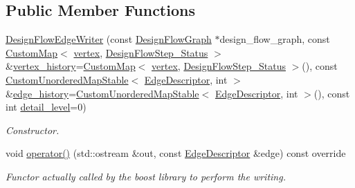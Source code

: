 \subsection*{Public Member Functions}
\begin{DoxyCompactItemize}
\item 
\hyperlink{classDesignFlowEdgeWriter_a3cdba4165ae8567ef5f98e632c9b03af}{Design\+Flow\+Edge\+Writer} (const \hyperlink{classDesignFlowGraph}{Design\+Flow\+Graph} $\ast$design\+\_\+flow\+\_\+graph, const \hyperlink{custom__map_8hpp_a18ca01763abbe3e5623223bfe5aaac6b}{Custom\+Map}$<$ \hyperlink{graph_8hpp_abefdcf0544e601805af44eca032cca14}{vertex}, \hyperlink{design__flow__step_8hpp_afb1f0d73069c26076b8d31dbc8ebecdf}{Design\+Flow\+Step\+\_\+\+Status} $>$ \&\hyperlink{classDesignFlowEdgeWriter_a3e839beeb21940663760c1b2c076f4d2}{vertex\+\_\+history}=\hyperlink{custom__map_8hpp_a18ca01763abbe3e5623223bfe5aaac6b}{Custom\+Map}$<$ \hyperlink{graph_8hpp_abefdcf0544e601805af44eca032cca14}{vertex}, \hyperlink{design__flow__step_8hpp_afb1f0d73069c26076b8d31dbc8ebecdf}{Design\+Flow\+Step\+\_\+\+Status} $>$(), const \hyperlink{custom__map_8hpp_a7314a7df1cdb3a3acf478ab86e95c226}{Custom\+Unordered\+Map\+Stable}$<$ \hyperlink{graph_8hpp_a9eb9afea34e09f484b21f2efd263dd48}{Edge\+Descriptor}, int $>$ \&\hyperlink{classDesignFlowEdgeWriter_a2b7e72d6aa6ed86b52d6b5d47cb6828a}{edge\+\_\+history}=\hyperlink{custom__map_8hpp_a7314a7df1cdb3a3acf478ab86e95c226}{Custom\+Unordered\+Map\+Stable}$<$ \hyperlink{graph_8hpp_a9eb9afea34e09f484b21f2efd263dd48}{Edge\+Descriptor}, int $>$(), const int \hyperlink{classEdgeWriter_a74d56c5b98f85a8141d854cfb392e553}{detail\+\_\+level}=0)
\begin{DoxyCompactList}\small\item\em Constructor. \end{DoxyCompactList}\item 
void \hyperlink{classDesignFlowEdgeWriter_ae15c12d95676a26eb77a96356000007e}{operator()} (std\+::ostream \&out, const \hyperlink{graph_8hpp_a9eb9afea34e09f484b21f2efd263dd48}{Edge\+Descriptor} \&edge) const override
\begin{DoxyCompactList}\small\item\em Functor actually called by the boost library to perform the writing. \end{DoxyCompactList}\end{DoxyCompactItemize}
